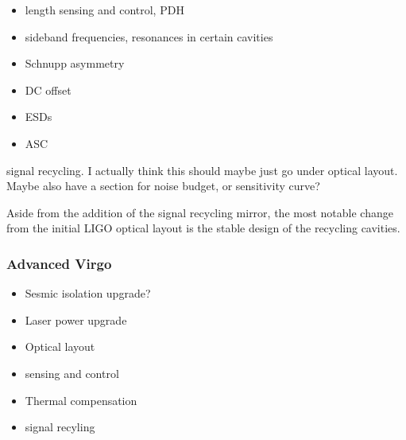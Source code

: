 \begin{itemize}
\item length sensing and control, PDH
\item sideband frequencies, resonances in certain cavities
\item Schnupp asymmetry
\item DC offset
\item ESDs
\item ASC
\end{itemize}

signal recycling. I actually think this should maybe just go under optical layout.
Maybe also have a section for noise budget, or sensitivity curve?








Aside from the addition of the signal recycling mirror, the most notable change from the initial LIGO optical 
layout is the stable design of the recycling cavities.


\subsubsection{Advanced Virgo}
\begin{itemize}
\item Sesmic isolation upgrade?
\item Laser power upgrade
\item Optical layout
\item sensing and control
\item Thermal compensation
\item signal recyling
\end{itemize}

